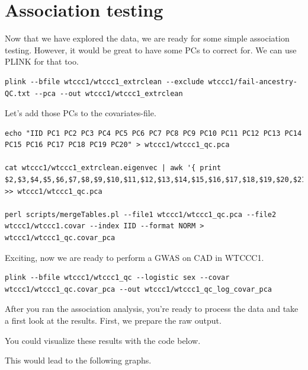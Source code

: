 \documentclass[
]{book}
\begin{document}
\hypertarget{association-testing}{%
\section{Association testing}\label{association-testing}}

Now that we have explored the data, we are ready for some simple association testing. However, it would be great to have some PCs to correct for. We can use PLINK for that too.

\begin{lstlisting}
plink --bfile wtccc1/wtccc1_extrclean --exclude wtccc1/fail-ancestry-QC.txt --pca --out wtccc1/wtccc1_extrclean
\end{lstlisting}

Let's add those PCs to the covariates-file.

\begin{lstlisting}
echo "IID PC1 PC2 PC3 PC4 PC5 PC6 PC7 PC8 PC9 PC10 PC11 PC12 PC13 PC14 PC15 PC16 PC17 PC18 PC19 PC20" > wtccc1/wtccc1_qc.pca

cat wtccc1/wtccc1_extrclean.eigenvec | awk '{ print $2,$3,$4,$5,$6,$7,$8,$9,$10,$11,$12,$13,$14,$15,$16,$17,$18,$19,$20,$21,$22}' >> wtccc1/wtccc1_qc.pca

perl scripts/mergeTables.pl --file1 wtccc1/wtccc1_qc.pca --file2 wtccc1/wtccc1.covar --index IID --format NORM > wtccc1/wtccc1_qc.covar_pca
\end{lstlisting}

Exciting, now we are ready to perform a GWAS on CAD in WTCCC1.

\begin{lstlisting}
plink --bfile wtccc1/wtccc1_qc --logistic sex --covar wtccc1/wtccc1_qc.covar_pca --out wtccc1/wtccc1_qc_log_covar_pca
\end{lstlisting}

After you ran the association analysis, you're ready to process the data and take a first look at the results. First, we prepare the raw output.

You could visualize these results with the code below.

This would lead to the following graphs.
\end{document}
